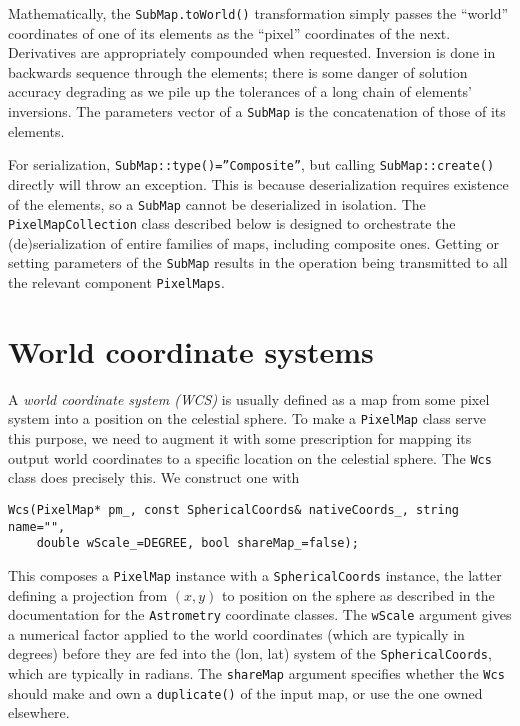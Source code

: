 \documentclass[11pt,preprint,flushrt]{aastex}
\begin{document}
Mathematically, the \texttt{SubMap.toWorld()} transformation simply passes the ``world'' coordinates of one of its elements as the ``pixel'' coordinates of the next.  Derivatives are appropriately compounded when requested.  Inversion is done in backwards sequence through the elements; there is some danger of solution accuracy degrading as we pile up the tolerances of a long chain of elements' inversions.  The parameters vector of a \texttt{SubMap} is the concatenation of those of its elements.

For serialization, \texttt{SubMap::type()=''Composite''}, but calling \texttt{SubMap::create()} directly will throw an exception.  This is because deserialization requires existence of the elements, so a \texttt{SubMap} cannot be deserialized in isolation.  The \texttt{PixelMapCollection} class described below is designed to orchestrate the (de)serialization of entire families of maps, including composite ones.
Getting or setting parameters of the {\tt SubMap} results in the operation being transmitted to all the relevant component {\tt PixelMaps}.


\section{World coordinate systems}
A \textit{world coordinate system (WCS)} is usually defined as a map from some pixel system into a position on the celestial sphere.  To make a \texttt{PixelMap} class serve this purpose, we need to augment it with some prescription for mapping its output world coordinates to a specific location on the celestial sphere.  The \texttt{Wcs} class does precisely this.  We construct one with
\begin{verbatim}
Wcs(PixelMap* pm_, const SphericalCoords& nativeCoords_, string name="", 
    double wScale_=DEGREE, bool shareMap_=false);
\end{verbatim}
This composes a \texttt{PixelMap} instance with a \texttt{SphericalCoords} instance, the latter defining a projection from $(x,y)$ to position on the sphere as described in the documentation for the \texttt{Astrometry} coordinate classes.  The \texttt{wScale} argument gives a numerical factor applied to the world coordinates (which are typically in degrees) before they are fed into the (lon, lat) system of the \texttt{SphericalCoords}, which are typically in radians.  The \texttt{shareMap} argument specifies whether the \texttt{Wcs} should make and own a \texttt{duplicate()} of the input map, or use the one owned elsewhere.
\end{document}
